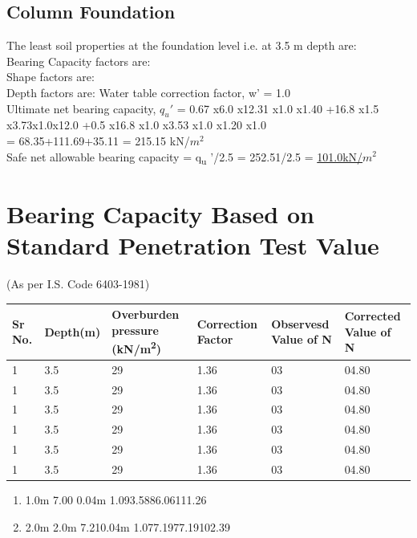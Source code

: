 \documentclass{soil1}
\begin{document}
\subsection{Column Foundation}
The least soil properties at the foundation level i.e. at 3.5 m depth are: \\
Bearing Capacity factors are:\\
Shape factors are:\\
Depth factors are:
Water table correction factor, w' = 1.0 \\
Ultimate net bearing capacity, $q_u'$ = 0.67 x6.0 x12.31 x1.0 x1.40 +16.8 x1.5 x3.73x1.0x12.0 +0.5 x16.8 x1.0 x3.53 x1.0 x1.20 x1.0\\
= 68.35+111.69+35.11 = 215.15 kN/$m^2$ \\	
 Safe net allowable bearing capacity = q\textsubscript{u} '/2.5 = 252.51/2.5 = \underline{101.0kN/$m^2$}
\section{Bearing Capacity Based on Standard Penetration Test Value}

\begin{center}
(As per I.S. Code 6403-1981)
\end{center}
\hspace{1.1cm}
\begin{tabularx}{\textwidth}{|*{6}{l|}}
\hline
 \multicolumn{1}{|m{1cm}|}{Sr No.} &\multicolumn{1}{m{2cm}|}{Depth(m)} &\multicolumn{1}{m{2.5cm}|}{Overburden pressure (kN/m\textsuperscript{2})}
&\multicolumn{1}{m{2cm}|}{Correction Factor} &\multicolumn{1}{m{2cm}|}{Observesd Value of N} &\multicolumn{1}{m{2.9cm}|}{Corrected Value of N}\\
\hline
1 &3.5 &29 &1.36 &03 &04.80\\
\hline
1 &3.5 &29 &1.36 &03 &04.80\\
\hline
1 &3.5 &29 &1.36 &03 &04.80\\
\hline
1 &3.5 &29 &1.36 &03 &04.80\\
\hline
1 &3.5 &29 &1.36 &03 &04.80\\
\hline
1 &3.5 &29 &1.36 &03 &04.80\\
\hline
\end{tabularx}

\begin{enumerate}
\item{ {1.0m} {7.00} {0.04m} {1.0}{93.58}{86.06}{111.26}}
\item{ {2.0m} {2.0m} {7.21}{0.04m} {1.0}{77.19}{77.19}{102.39}
}

\end{enumerate}
\end{document}
